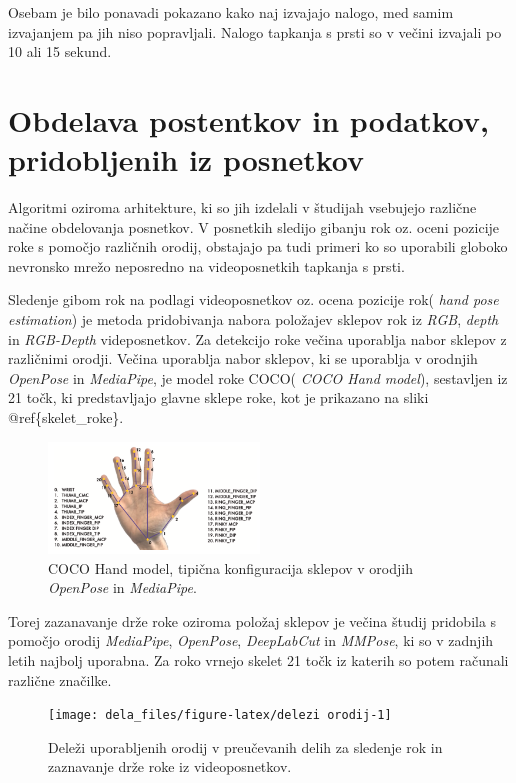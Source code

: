 \documentclass[
]{article}
\begin{document}
Osebam je bilo ponavadi pokazano kako naj izvajajo nalogo, med samim
izvajanjem pa jih niso popravljali. Nalogo tapkanja s prsti so v večini
izvajali po 10 ali 15 sekund.

\section{Obdelava postentkov in podatkov, pridobljenih iz
posnetkov}\label{obdelava-postentkov-in-podatkov-pridobljenih-iz-posnetkov}

Algoritmi oziroma arhitekture, ki so jih izdelali v študijah vsebujejo
različne načine obdelovanja posnetkov. V posnetkih sledijo gibanju rok
oz. oceni pozicije roke s pomočjo različnih orodij, obstajajo pa tudi
primeri ko so uporabili globoko nevronsko mrežo neposredno na
videoposnetkih tapkanja s prsti.

Sledenje gibom rok na podlagi videoposnetkov oz. ocena pozicije rok(
\emph{hand pose estimation}) je metoda pridobivanja nabora položajev
sklepov rok iz \emph{RGB}, \emph{depth} in \emph{RGB-Depth}
videposnetkov. Za detekcijo roke večina uporablja nabor sklepov z
različnimi orodji. Večina uporablja nabor sklepov, ki se uporablja v
orodnjih \emph{OpenPose} in \emph{MediaPipe}, je model roke COCO(
\emph{COCO Hand model}), sestavljen iz 21 točk, ki predstavljajo glavne
sklepe roke, kot je prikazano na sliki @ref\{skelet\_roke\}.

\begin{figure}
\centering
\includegraphics[width=0.5\textwidth,height=\textheight]{slike/skelet_roke.png}
\caption{COCO Hand model, tipična konfiguracija sklepov v orodjih
\emph{OpenPose} in \emph{MediaPipe}.}
\end{figure}

Torej zazanavanje drže roke oziroma položaj sklepov je večina študij
pridobila s pomočjo orodij \emph{MediaPipe}, \emph{OpenPose},
\emph{DeepLabCut} in \emph{MMPose}, ki so v zadnjih letih najbolj
uporabna. Za roko vrnejo skelet 21 točk iz katerih so potem računali
različne značilke.

\begin{figure}[H]

{\centering \texttt{[image: dela\_files/figure-latex/delezi orodij-1]} 

}

\caption{Deleži uporabljenih orodij v preučevanih delih za sledenje rok in zaznavanje drže roke iz videoposnetkov. }\label{fig:delezi orodij}
\end{figure}
\end{document}

